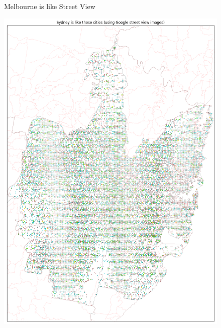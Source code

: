 \documentclass[sageh,times]{sagej}
\begin{document}
\begin{figure}[!htbp]
\caption{Melbourne is like Street View}    
 \label{fig:melmaps}  
\end{figure} 


\begin{figure}[!htbp]
\centering    
\includegraphics[scale=0.25]{Images/SydneyOverall_street.png} 

\end{figure}
\end{document}
